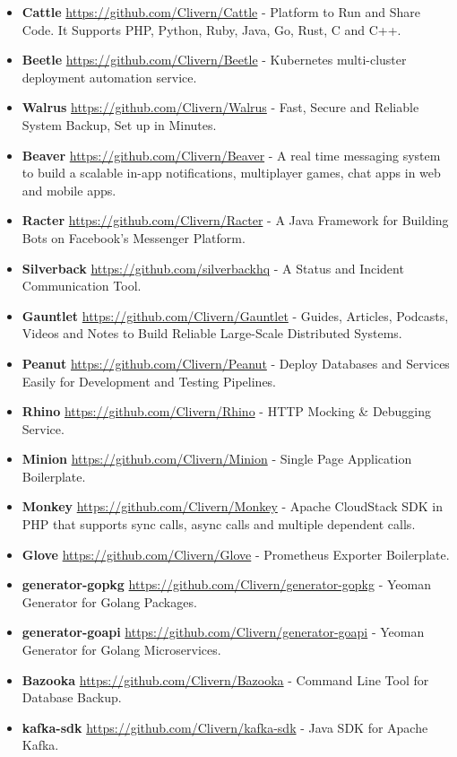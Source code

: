 \documentclass[paper=a4,fontsize=11pt]{scrartcl} %
\begin{document}
\begin{itemize}
\item \textbf{Cattle} \url{https://github.com/Clivern/Cattle} - Platform to Run and Share Code. It Supports PHP, Python, Ruby, Java, Go, Rust, C and C++.
\item \textbf{Beetle} \url{https://github.com/Clivern/Beetle} - Kubernetes multi-cluster deployment automation service.
\item \textbf{Walrus} \url{https://github.com/Clivern/Walrus} - Fast, Secure and Reliable System Backup, Set up in Minutes.
\item \textbf{Beaver} \url{https://github.com/Clivern/Beaver} - A real time messaging system to build a scalable in-app notifications, multiplayer games, chat apps in web and mobile apps.
\item \textbf{Racter} \url{https://github.com/Clivern/Racter} - A Java Framework for Building Bots on Facebook's Messenger Platform.
\item \textbf{Silverback} \url{https://github.com/silverbackhq} - A Status and Incident Communication Tool.
\item \textbf{Gauntlet} \url{https://github.com/Clivern/Gauntlet} - Guides, Articles, Podcasts, Videos and Notes to Build Reliable Large-Scale Distributed Systems.
\item \textbf{Peanut} \url{https://github.com/Clivern/Peanut} - Deploy Databases and Services Easily for Development and Testing Pipelines.
\item \textbf{Rhino} \url{https://github.com/Clivern/Rhino} - HTTP Mocking \& Debugging Service.
\item \textbf{Minion} \url{https://github.com/Clivern/Minion} - Single Page Application Boilerplate.
\item \textbf{Monkey} \url{https://github.com/Clivern/Monkey} - Apache CloudStack SDK in PHP that supports sync calls, async calls and multiple dependent calls.
\item \textbf{Glove} \url{https://github.com/Clivern/Glove} - Prometheus Exporter Boilerplate.
\item \textbf{generator-gopkg} \url{https://github.com/Clivern/generator-gopkg} - Yeoman Generator for Golang Packages.
\item \textbf{generator-goapi} \url{https://github.com/Clivern/generator-goapi} - Yeoman Generator for Golang Microservices.
\item \textbf{Bazooka} \url{https://github.com/Clivern/Bazooka} - Command Line Tool for Database Backup.
\item \textbf{kafka-sdk} \url{https://github.com/Clivern/kafka-sdk} - Java SDK for Apache Kafka.

\end{itemize}
\end{document}
